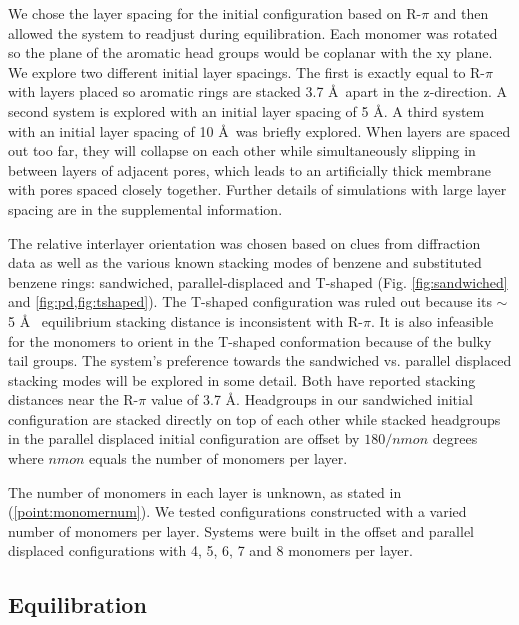 \documentclass{article}
\newcommand{\angstrom}{\textup{\AA}}
\begin{document}
  We chose the layer spacing for the initial configuration based on R-$\pi$ and
  then allowed the system to readjust during equilibration. Each monomer was
  rotated so the plane of the aromatic head groups would be coplanar with the xy
  plane.  We explore two different initial layer spacings. The first is exactly
  equal to R-$\pi$ with layers placed so aromatic rings are stacked 3.7
  \angstrom~apart in the z-direction. A second system is explored with an initial
  layer spacing of 5 \angstrom. A third system with an initial layer spacing of
  10 \angstrom~was briefly explored. When layers are spaced out too far, they
  will collapse on each other while simultaneously slipping in between layers of
  adjacent pores, which leads to an artificially thick membrane with pores spaced
  closely together.  Further details of simulations with large layer spacing are
  in the supplemental information.

  The relative interlayer orientation was chosen based on clues from
  diffraction data as well as the various known stacking modes of benzene and
  substituted benzene rings: sandwiched, parallel-displaced and T-shaped
  \cite{sinnokrot_estimates_2002} (Fig. \ref{fig:sandwiched} and \ref{fig:pd,fig:tshaped}).
  The T-shaped configuration was ruled out because its $\sim$5 \angstrom~
  equilibrium stacking distance \cite{sinnokrot_estimates_2002} is inconsistent
  with R-$\pi$. It is also infeasible for the monomers to orient in the T-shaped
  conformation because of the bulky tail groups. The system's preference towards
  the sandwiched vs. parallel displaced stacking modes will be explored in some
  detail. Both have reported stacking distances near the R-$\pi$ value of 3.7
  \angstrom. Headgroups in our sandwiched initial configuration are stacked
  directly on top of each other while stacked headgroups in the parallel
  displaced initial configuration are offset by $180/nmon$ degrees where $nmon$
  equals the number of monomers per layer.

  The number of monomers in each layer is unknown, as stated in
  (\ref{point:monomernum}). We tested configurations constructed with a varied
  number of monomers per layer. Systems were built in the offset and parallel
  displaced configurations with 4, 5, 6, 7 and 8 monomers per layer.

  \subsection{Equilibration}
\end{document}
